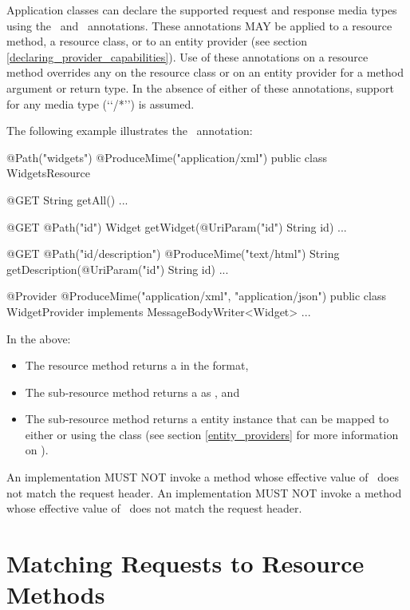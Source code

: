 Application classes can declare the supported request and response media types using the \ProduceMime\ and \ConsumeMime\ annotations. These annotations MAY be applied to a resource method, a resource class, or to an entity provider (see section \ref{declaring_provider_capabilities}). Use of these annotations on a resource method overrides any on the resource class or on an entity provider for a method argument or return type. In the absence of either of these annotations, support for any media type (\lq\lq*/*\rq\rq) is assumed.

The following example illustrates the \ProduceMime\ annotation:

\begin{listing}{1}
@Path("widgets")
@ProduceMime("application/xml")
public class WidgetsResource {
  
  @GET
  String getAll() {...}
  
  @GET
  @Path("{id}")
  Widget getWidget(@UriParam("id") String id) {...}

  @GET
  @Path("{id}/description")
  @ProduceMime("text/html")
  String getDescription(@UriParam("id") String id) {...}
}

@Provider
@ProduceMime({"application/xml", "application/json"})
public class WidgetProvider implements MessageBodyWriter<Widget> {...}
\end{listing}

In the above:
\begin{itemize}
\item The  resource method returns a  in the  format, 
\item The  sub-resource method returns a  as , and
\item The  sub-resource method returns a  entity instance that can be mapped to either  or  using the  class (see section \ref{entity_providers} for more information on \MsgWrite).
\end{itemize}

An implementation MUST NOT invoke a method whose effective value of \ProduceMime\ does not match the request  header. An implementation MUST NOT invoke a method whose effective value of \ConsumeMime\ does not match the request  header.

\section{Matching Requests to Resource Methods}
\label{mapping_requests_to_java_methods}

